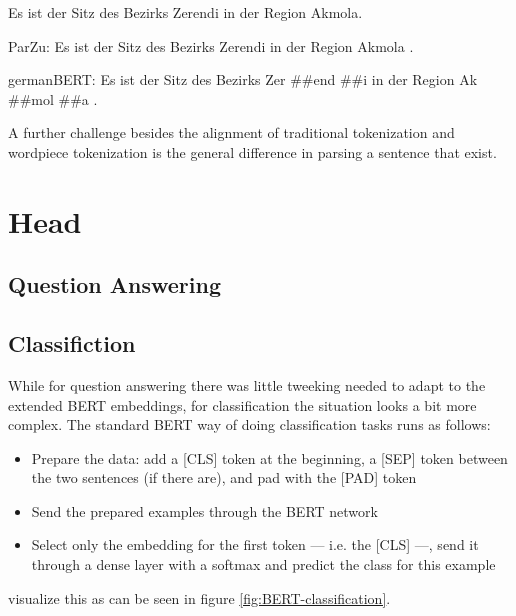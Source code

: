 \begin{examples}
	\label{ex:tokenization-diff}
	\item Es ist der Sitz des Bezirks Zerendi in der Region Akmola.
	\item ParZu: Es ist der Sitz des Bezirks Zerendi in der Region Akmola .
	\item germanBERT: Es ist der Sitz des Bezirks Zer \#\#end \#\#i in der Region Ak \#\#mol \#\#a .
\end{examples}


A further challenge besides the alignment of traditional tokenization and wordpiece tokenization is the general difference in parsing a sentence that exist.

\section{Head}

\subsection{Question Answering}

\subsection{Classifiction}

While for question answering there was little tweeking needed to adapt to the extended BERT embeddings, for classification the situation looks a bit more complex.
The standard BERT way of doing classification tasks runs as follows:

\begin{itemize}
  \item Prepare the data: add a [CLS] token at the beginning, a [SEP] token between the two sentences (if there are), and pad with the [PAD] token
  \item Send the prepared examples through the BERT network
  \item Select only the embedding for the first token  --- i.e. the [CLS] ---, send it through a dense layer with a softmax and predict the class for this example
\end{itemize}

\cite{devlin2018bert} visualize this as can be seen in figure \ref{fig:BERT-classification}.




